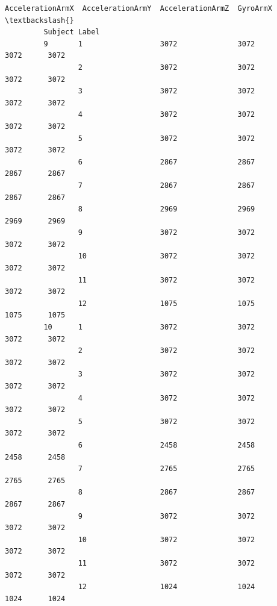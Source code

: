\documentclass[11pt]{article}
\begin{document}
\begin{Verbatim}[commandchars=\\\{\}]
                        AccelerationArmX  AccelerationArmY  AccelerationArmZ  GyroArmX  \textbackslash{}
         Subject Label                                                                   
         9       1                  3072              3072              3072      3072   
                 2                  3072              3072              3072      3072   
                 3                  3072              3072              3072      3072   
                 4                  3072              3072              3072      3072   
                 5                  3072              3072              3072      3072   
                 6                  2867              2867              2867      2867   
                 7                  2867              2867              2867      2867   
                 8                  2969              2969              2969      2969   
                 9                  3072              3072              3072      3072   
                 10                 3072              3072              3072      3072   
                 11                 3072              3072              3072      3072   
                 12                 1075              1075              1075      1075   
         10      1                  3072              3072              3072      3072   
                 2                  3072              3072              3072      3072   
                 3                  3072              3072              3072      3072   
                 4                  3072              3072              3072      3072   
                 5                  3072              3072              3072      3072   
                 6                  2458              2458              2458      2458   
                 7                  2765              2765              2765      2765   
                 8                  2867              2867              2867      2867   
                 9                  3072              3072              3072      3072   
                 10                 3072              3072              3072      3072   
                 11                 3072              3072              3072      3072   
                 12                 1024              1024              1024      1024   
         

\end{Verbatim}
\end{document}
